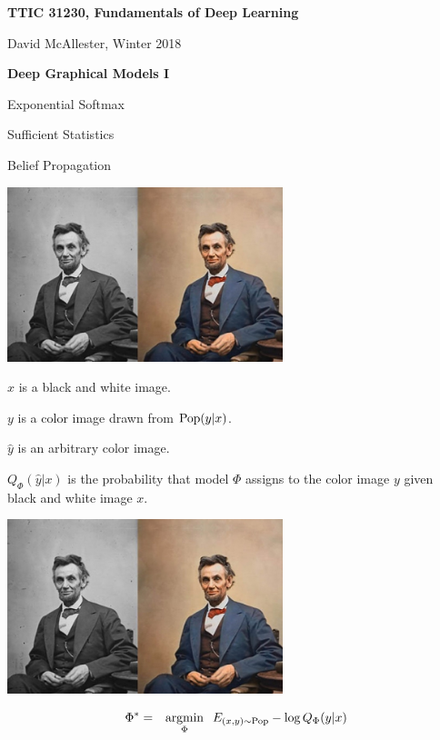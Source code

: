 



{\Huge

  \centerline{\bf TTIC 31230, Fundamentals of Deep Learning}
  \bigskip
  \centerline{David McAllester, Winter 2018}
  \vfill
  \centerline{\bf Deep Graphical Models I}
  \vfill
  \vfill
  \centerline{Exponential Softmax}
  \vfill
  \centerline{Sufficient Statistics}
  \vfill
  \centerline{Belief Propagation}
  
\vfill



\centerline{\includegraphics[height = 2in]{../images/colorization}}

$x$ is a black and white image.

\vfill
$y$ is a color image drawn from $\mathrm{Pop}(y|x)$.

\vfill
$\hat{y}$ is an arbitrary color image.

\vfill
$Q_\Phi(\hat{y}|x)$ is the probability that model $\Phi$ assigns to the color image $y$ given black and white image $x$.


\centerline{\includegraphics[height = 2in]{../images/colorization}}

\vfill
\begin{eqnarray*}
\Phi^* & =  & \operatorname*{argmin}_\Phi \;\;E_{(x,y) \sim \mathrm{Pop}}  -\log Q_\Phi(y|x)
 \end{eqnarray*}


}

